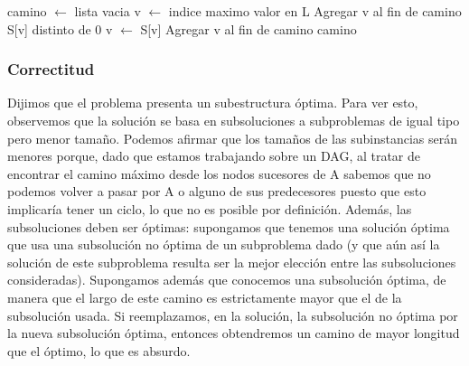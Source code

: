\begin{algorithm}[H]
\caption{} 
\label{pseudocodigo_armarCamino}
\begin{codebox}
\li camino $\gets$ lista vacia
\li v $\gets$ indice maximo valor en L
\li Agregar v al fin de camino 
\li	\While S[v] distinto de 0 \Do
\li		v $\gets$ S[v]
\li		Agregar v al fin de camino
	\End
\li \Return camino	
	\End
\end{codebox}
\end{algorithm}

\subsubsection{Correctitud} 

Dijimos que el problema presenta un subestructura \'optima. Para ver esto, observemos que la soluci\'on se basa en subsoluciones a subproblemas de igual tipo pero menor tamaño. 
Podemos afirmar que los tamaños de las subinstancias ser\'an menores porque, dado que estamos trabajando sobre un DAG, al tratar de encontrar el camino m\'aximo desde los nodos sucesores de A sabemos que no podemos volver a pasar por A o alguno de sus predecesores puesto que esto implicar\'ia tener un ciclo, lo que no es posible por definici\'on. 
Adem\'as, las subsoluciones deben ser \'optimas: supongamos que tenemos una soluci\'on \'optima que usa una subsoluci\'on no \'optima de un subproblema dado (y que a\'un as\'i la soluci\'on de este subproblema resulta ser la mejor elecci\'on entre las subsoluciones consideradas). Supongamos adem\'as que conocemos una subsoluci\'on \'optima, de manera que el largo de este camino es estrictamente mayor que el de la subsoluci\'on usada. Si reemplazamos, en la soluci\'on, la subsoluci\'on no \'optima por la nueva subsoluci\'on \'optima, entonces obtendremos un camino de mayor longitud que el \'optimo, lo que es absurdo.

